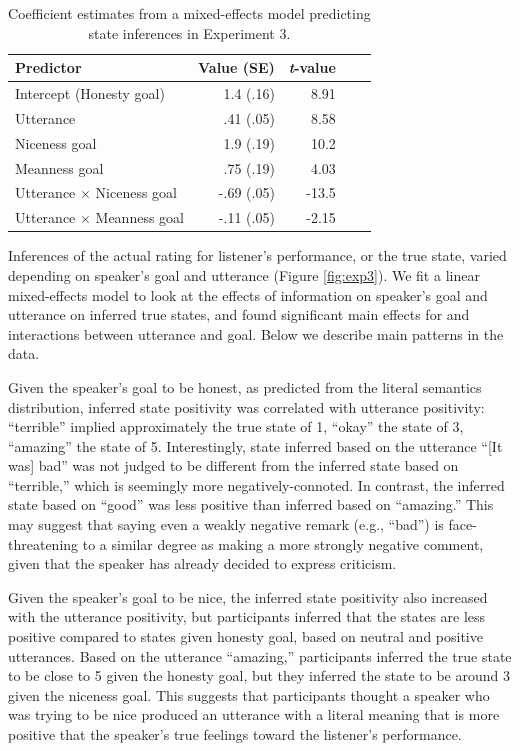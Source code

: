 \documentclass[10pt,letterpaper]{article}
\begin{document}
\begin{table}[t]
\caption{\label{tab:lmer2}  Coefficient estimates from a mixed-effects model predicting state inferences in Experiment 3.} 
\begin{center} 
\begin{tabular}{l r r r l} 
\hline
Predictor  &  Value (SE) & \emph{t}-value\\
\hline
Intercept (Honesty goal)  & 1.4 (.16) & 8.91 \\
Utterance & .41 (.05) &  8.58 \\
Niceness goal  & 1.9 (.19) & 10.2 \\
Meanness goal & .75 (.19) & 4.03 \\
Utterance $\times$ Niceness goal & -.69 (.05) & -13.5 \\
Utterance $\times$ Meanness goal & -.11 (.05) & -2.15 \\
\hline
\end{tabular} 
\end{center} 
\end{table}

Inferences of the actual rating for listener's performance, or the true state, varied depending on speaker's goal and utterance (Figure \ref{fig:exp3}). We fit a linear mixed-effects model to look at the effects of information on speaker's goal and utterance on inferred true states, and found significant main effects for and interactions between utterance and goal. Below we describe main patterns in the data.

Given the speaker's goal to be honest, as predicted from the literal semantics distribution, inferred state positivity was correlated with utterance positivity: ``terrible'' implied approximately the true state of 1, ``okay'' the state of 3, ``amazing'' the state of 5. Interestingly, state inferred based on the utterance ``[It was] bad'' was not judged to be different from the inferred state based on ``terrible,'' which is seemingly more negatively-connoted. In contrast, the inferred state based on ``good'' was less positive than inferred based on ``amazing.'' This may suggest that saying even a weakly negative remark (e.g., ``bad'') is face-threatening to a similar degree as making a more strongly negative comment, given that the speaker has already decided to express criticism.

Given the speaker's goal to be nice, the inferred state positivity also increased with the utterance positivity, but participants inferred that the states are less positive compared to states given honesty goal, based on neutral and positive utterances. Based on the utterance ``amazing,'' participants inferred the true state to be close to 5 given the honesty goal, but they inferred the state to be around 3 given the niceness goal. This suggests that participants thought a speaker who was trying to be nice produced an utterance  with a literal meaning that is more positive that the speaker's true feelings toward the listener's performance.
\end{document}

